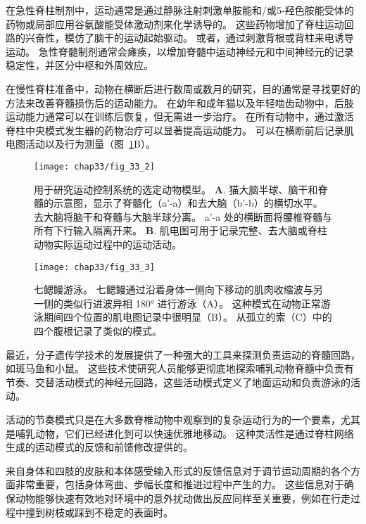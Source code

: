 \begin{proposition}[用于研究运动神经元控制的制剂]
	\quad \quad 在急性脊柱制剂中，运动通常是通过静脉注射刺激单胺能和/或5-羟色胺能受体的药物或局部应用谷氨酸能受体激动剂来化学诱导的。
	这些药物增加了脊柱运动回路的兴奋性，模仿了脑干的运动起始驱动。
	或者，通过刺激背根或背柱来电诱导运动。
	急性脊髓制剂通常会瘫痪，以增加脊髓中运动神经元和中间神经元的记录稳定性，并区分中枢和外周效应。
	
	\quad \quad 在慢性脊柱准备中，动物在横断后进行数周或数月的研究，目的通常是寻找更好的方法来改善脊髓损伤后的运动能力。
	在幼年和成年猫以及年轻啮齿动物中，后肢运动能力通常可以在训练后恢复，但无需进一步治疗。
	在所有动物中，通过激活脊柱中央模式发生器的药物治疗可以显著提高运动能力。
	可以在横断前后记录肌电图活动以及行为测量（图~\ref{fig:33_2}B）。
	
\end{proposition}


\begin{figure}[htbp]
	\centering
	\texttt{[image: chap33/fig\_33\_2]}
	\caption{用于研究运动控制系统的选定动物模型。
	\textbf{A}. 猫大脑半球、脑干和脊髓的示意图，显示了脊髓化（a'-a）和去大脑（b'-b）的横切水平。
	去大脑将脑干和脊髓与大脑半球分离。
	a'-a 处的横断面将腰椎脊髓与所有下行输入隔离开来。
	\textbf{B}. 肌电图可用于记录完整、去大脑或脊柱动物实际运动过程中的运动活动。}
	\label{fig:33_2}
\end{figure}


\begin{figure}[htbp]
	\centering
	\texttt{[image: chap33/fig\_33\_3]}
	\caption{七鳃鳗游泳。
	七鳃鳗通过沿着身体一侧向下移动的肌肉收缩波与另一侧的类似行进波异相 180° 进行游泳（A）。
	这种模式在动物正常游泳期间四个位置的肌电图记录中很明显（B）。
	从孤立的索（C）中的四个腹根记录了类似的模式。}
	\label{fig:33_3}
\end{figure}


最近，分子遗传学技术的发展提供了一种强大的工具来探测负责运动的脊髓回路，如斑马鱼和小鼠。
这些技术使研究人员能够更彻底地探索哺乳动物脊髓中负责有节奏、交替活动模式的神经元回路，这些活动模式定义了地面运动和负责游泳的活动。


活动的节奏模式只是在大多数脊椎动物中观察到的复杂运动行为的一个要素，尤其是哺乳动物，它们已经进化到可以快速优雅地移动。
这种灵活性是通过脊柱网络生成的运动模式的反馈和前馈修改提供的。


来自身体和四肢的皮肤和本体感受输入形式的反馈信息对于调节运动周期的各个方面非常重要，包括身体弯曲、步幅长度和推进过程中产生的力。
这些信息对于确保动物能够快速有效地对环境中的意外扰动做出反应同样至关重要，例如在行走过程中撞到树枝或踩到不稳定的表面时。


